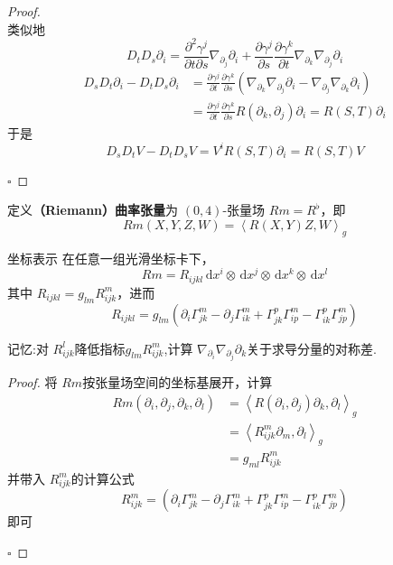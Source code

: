 \documentclass[../../几何与拓扑.tex]{subfiles}
\begin{document}
\begin{proof}
\[    \]类似地 \[
    D_{t}D_{s}\partial _{i}= \frac{\partial ^{2} \gamma ^{j}}{\partial t  \partial s} \nabla _{\partial _{j}}\partial _{i}+  \frac{\partial  \gamma ^{j}}{\partial s}\frac{\partial  \gamma ^{k}}{\partial t} \nabla _{\partial _{k}} \nabla _{\partial _{j}} \partial _{i}
    \] \[
  \begin{aligned}
    D_{s}D_{t}\partial _{i}-D_{t}D_{s}\partial _{i}&= \frac{\partial  \gamma ^{j}}{\partial t}\frac{\partial  \gamma ^{k}}{\partial s} \left(  \nabla _{\partial _{k}} \nabla _{\partial _{j}}\partial _{i}- \nabla _{\partial _{j}} \nabla _{\partial _{k}}\partial _{i}  \right) \\ 
     & = \frac{\partial  \gamma ^{j}}{\partial t} \frac{\partial  \gamma ^{k}}{\partial s} R\left( \partial _{k},\partial _{j} \right)\partial _{i} = R\left( S,T \right)\partial _{i} 
  \end{aligned}
    \]于是 \[
    D_{s}D_{t}V-D_{t}D_{s}V= V^{i}R\left( S,T \right)\partial _{i}= R\left( S,T \right)V  
    \] 

    \hfill $\square$
\end{proof}


\begin{definition}
    定义\textbf{（Riemann）曲率张量}为 \(  \left( 0,4 \right)   \)-张量场 \(  Rm= R^{\flat }  \)，即 \[
    Rm\left( X,Y,Z,W \right)= \left<R\left( X,Y \right)Z,W  \right>_{g} 
    \]  
\end{definition}

\begin{proposition}{坐标表示}
    在任意一组光滑坐标卡下， \[
    Rm= R_{ijkl}\,\mathrm{d} x^{i}\otimes \,\mathrm{d} x^{j}\otimes \,\mathrm{d} x^{k}\otimes \,\mathrm{d} x^{l}
    \]其中 \(  R_{ijkl}= g_{lm}R_{ijk}^{m}  \)，进而 \[
    R_{ijkl}= g_{lm}\left( \partial _{i} \Gamma _{jk}^{m}-\partial _{j} \Gamma _{ik}^{m}+  \Gamma _{jk}^{p} \Gamma _{ip}^{m}- \Gamma _{ik}^{p} \Gamma _{jp}^{m} \right) 
    \] 
\end{proposition}

\begin{note}
    记忆:对 \(  R_{ijk}^{l}  \)降低指标\(  g_{lm}R_{ijk}^{m}  \),计算 \(   \nabla _{ \partial _{i}} \nabla _{ \partial _{j}} \partial _{k}  \)关于求导分量的对称差.   
\end{note}
\begin{proof}
     将 \(  Rm  \)按张量场空间的坐标基展开，计算 \[
     \begin{aligned}
        Rm\left( \partial _{i},\partial _{j},\partial _{k},\partial _{l} \right)&= \left<R\left( \partial _{i},\partial _{j} \right)\partial _{k},\partial _{l}  \right>_{g} \\ 
         & =  \left<R_{ijk}^{m}\partial _{m},\partial _{l} \right>_{g}\\ 
          & =g_{ml} R_{ijk}^{m}
     \end{aligned}
     \]并带入 \(  R_{ijk}^{m}  \)的计算公式 \[
     R_{ijk}^{m}= \left( \partial _{i} \Gamma _{jk}^{m}-\partial _{j} \Gamma _{ik}^{m}+  \Gamma _{jk}^{p} \Gamma _{ip}^{m}- \Gamma _{ik}^{p} \Gamma _{jp}^{m} \right) 
     \] 即可

    \hfill $\square$
\end{proof}
\end{document}
